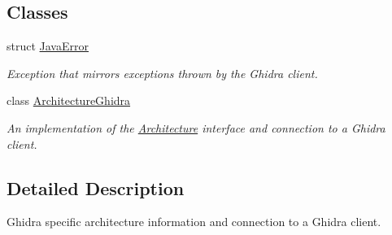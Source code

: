 \subsection*{Classes}
\begin{DoxyCompactItemize}
\item 
struct \mbox{\hyperlink{struct_java_error}{Java\+Error}}
\begin{DoxyCompactList}\small\item\em Exception that mirrors exceptions thrown by the Ghidra client. \end{DoxyCompactList}\item 
class \mbox{\hyperlink{class_architecture_ghidra}{Architecture\+Ghidra}}
\begin{DoxyCompactList}\small\item\em An implementation of the \mbox{\hyperlink{class_architecture}{Architecture}} interface and connection to a Ghidra client. \end{DoxyCompactList}\end{DoxyCompactItemize}


\subsection{Detailed Description}
Ghidra specific architecture information and connection to a Ghidra client. 

